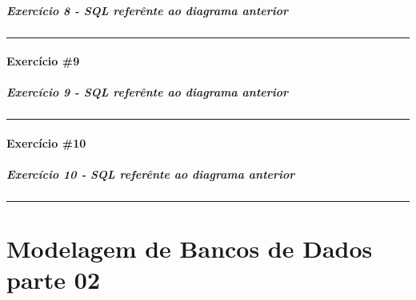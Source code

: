 \documentclass[
]{book}
\makeatletter
\newcommand*\pandocbounded[1]{%
  \sbox\pandoc@box{#1}%
  \Gscale@div\@tempa{\textheight}{\dimexpr\ht\pandoc@box+\dp\pandoc@box\relax}%
  \Gscale@div\@tempb{\linewidth}{\wd\pandoc@box}%
  \ifdim\@tempb\p@<\@tempa\p@\let\@tempa\@tempb\fi%
  \ifdim\@tempa\p@<\p@\scalebox{\@tempa}{\usebox\pandoc@box}%
  \else\usebox{\pandoc@box}%
  \fi%
}
\makeatother
\begin{document}
\pandocbounded{}

\paragraph{Exercício 8 - SQL referênte ao diagrama anterior}\label{exercuxedcio-8---sql-referuxeante-ao-diagrama-anterior}

\begin{center}\rule{0.5\linewidth}{0.5pt}\end{center}

\subsubsection{Exercício \#9}\label{exercuxedcio-9}

\pandocbounded{}

\paragraph{Exercício 9 - SQL referênte ao diagrama anterior}\label{exercuxedcio-9---sql-referuxeante-ao-diagrama-anterior}

\begin{center}\rule{0.5\linewidth}{0.5pt}\end{center}

\subsubsection{Exercício \#10}\label{exercuxedcio-10}

\pandocbounded{}

\paragraph{Exercício 10 - SQL referênte ao diagrama anterior}\label{exercuxedcio-10---sql-referuxeante-ao-diagrama-anterior}

\begin{center}\rule{0.5\linewidth}{0.5pt}\end{center}

\chapter{Modelagem de Bancos de Dados parte 02}\label{modelagem-de-bancos-de-dados-parte-02}
\end{document}
